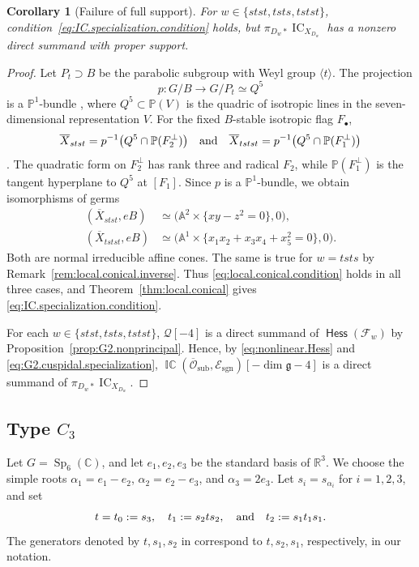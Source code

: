 \documentclass[11pt]{amsart}
\numberwithin{equation}{section}
\newtheorem{corollary}[theorem]{Corollary}
\theoremstyle{definition}
\def\and{\quad{\rm and}\quad}
\def\lra{\longrightarrow }
\DeclareMathOperator{\IC}{\mathrm{IC}}
\DeclareMathOperator{\ICperv}{\mathbb{IC}}
\DeclareMathOperator{\Hess}{\mathsf{Hess}}
\def\A{\mathbb{A}}
\def\C{\mathbb{C}}
\def\PP{\mathbb{P}}
\def\fg{\mathfrak {g}}
\begin{document}
\begin{corollary}[Failure of full support]\label{cor:G2.full.support}
For $w\in\{stst,tsts,tstst\}$, condition~\eqref{eq:IC.specialization.condition} holds, but $\pi_{D_w*}\IC_{X_{D_w}}$ has a nonzero direct summand with proper support.
\end{corollary}
\begin{proof}
Let $P_t\supset B$ be the parabolic subgroup with Weyl group $\langle t\rangle$.
The projection
\[p:G/B\lra G/P_t\simeq Q^5\]
is a $\PP^1$-bundle \cite[Proposition~4.1]{anderson11}, where $Q^5\subset\PP(V)$ is the quadric of isotropic lines in the seven-dimensional representation $V$.
For the fixed $B$-stable isotropic flag $F_\bullet$,
\[
\overline X_{stst}
=p^{-1}\big(Q^5\cap\PP(F_2^\perp)\big)
\and
\overline X_{tstst}
=p^{-1}\big(Q^5\cap\PP(F_1^\perp)\big)
\]
\cite[Section~4.2]{anderson11}.
The quadratic form on $F_2^\perp$ has rank three and radical $F_2$, while $\PP(F_1^\perp)$ is the tangent hyperplane to $Q^5$ at $[F_1]$.
Since $p$ is a $\PP^1$-bundle, we obtain isomorphisms of germs
\[
\begin{aligned}
(\overline X_{stst},eB)
&\simeq
\bigl(\A^2\times\{xy-z^2=0\},0\bigr),\\
(\overline X_{tstst},eB)
&\simeq
\bigl(\A^1\times
\{x_1x_2+x_3x_4+x_5^2=0\},0\bigr).
\end{aligned}
\]
Both are normal irreducible affine cones.
The same is true for $w=tsts$ by Remark~\ref{rem:local.conical.inverse}.
Thus \eqref{eq:local.conical.condition} holds in all three cases, and Theorem~\ref{thm:local.conical} gives \eqref{eq:IC.specialization.condition}.

For each $w\in\{stst,tsts,tstst\}$, $\mathcal Q[-4]$ is a direct summand of $\Hess(\mathcal F_w)$ by Proposition~\ref{prop:G2.nonprincipal}.
Hence, by \eqref{eq:nonlinear.Hess} and \eqref{eq:G2.cuspidal.specialization}, $\ICperv(\overline{\mathcal O}_{\mathrm{sub}},
        \mathcal E_{\mathrm{sgn}})[-\dim\fg-4]$ is a direct summand of $\pi_{D_w*}\IC_{X_{D_w}}$.
\end{proof}


\subsection{Type \texorpdfstring{$C_3$}{C3}}\label{ss:C3}

Let $G=\operatorname{Sp}_6(\C)$, and let $e_1,e_2,e_3$ be the standard basis of $\mathbb R^3$. 
We choose the simple roots $\alpha_1=e_1-e_2$, $\alpha_2=e_2-e_3$, and $\alpha_3=2e_3$.
Let $s_i=s_{\alpha_i}$ for $i=1,2,3$, and set
\[
t=t_0:=s_3,\quad t_1:=s_2ts_2,\and t_2:=s_1t_1s_1.
\]
The generators denoted by $t,s_1,s_2$ in \cite[Example~3.4.8 and Table~10.3]{GP} correspond to $t,s_2,s_1$, respectively, in our notation.
\end{document}
